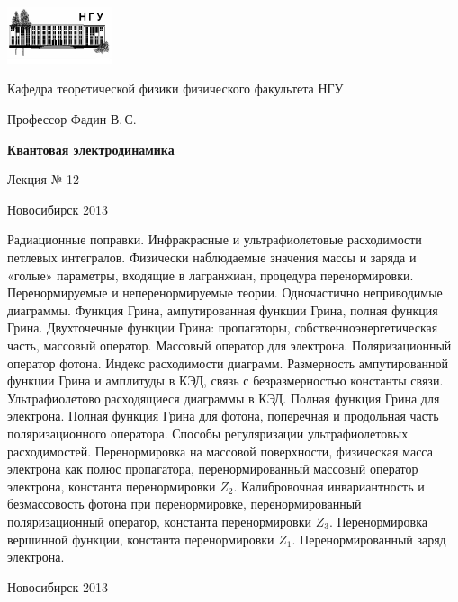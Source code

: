 \documentclass[12pt,pagesize,paper=192mm:108mm]{scrbook}
\begin{document}
\begin{titlepage}
  \vspace*{-1em}
  \begin{center}
    \includegraphics[width=0.23\textwidth]{../NSU-logo}

    Кафедра теоретической физики физического факультета НГУ
    \medskip

    \Large
    Профессор Фадин В.\,С.
    \bigskip

    \huge
    \textbf{Квантовая электродинамика}
    \bigskip

    \Large
    Лекция № 12
    \vfill

    \normalsize
    \vfill

    \normalsize \ccbysa\hspace{0.5em}  Новосибирск 2013
  \end{center}
\end{titlepage}
\vspace*{-1em}
\begin{center}
\vfill
  \begin{minipage}{0.85\linewidth}
    Радиационные поправки. Инфракрасные и ультрафиолетовые
    расходимости петлевых интегралов. Физически наблюдаемые значения
    массы и заряда и «голые» параметры, входящие в лагранжиан,
    процедура перенормировки. Перенормируемые и неперенормируемые
    теории. Одночастично неприводимые диаграммы. Функция Грина,
    ампутированная функции Грина, полная функция Грина. Двухточечные
    функции Грина: пропагаторы, собственноэнергетическая часть,
    массовый оператор. Массовый оператор для электрона.
    Поляризационный оператор фотона. Индекс расходимости
    диаграмм. Размерность ампутированной функции Грина и амплитуды в
    КЭД, связь с безразмерностью константы связи. Ультрафиолетово
    расходящиеся диаграммы в КЭД. Полная функция Грина для
    электрона. Полная функция Грина для фотона, поперечная и
    продольная часть поляризационного оператора. Способы регуляризации
    ультрафиолетовых расходимостей.  Перенормировка на массовой
    поверхности, физическая масса электрона как полюс пропагатора,
    перенормированный массовый оператор электрона, константа
    перенормировки $Z_2$. Калибровочная инвариантность и безмассовость
    фотона при перенормировке, перенормированный поляризационный
    оператор, константа перенормировки $Z_3$.  Перенормировка
    вершинной функции, константа перенормировки
    $Z_1$. Перенормированный заряд электрона.
  \end{minipage}
  \vfill

  \normalsize \ccbysa\hspace{0.5em} Новосибирск 2013
\end{center}
\end{document}
